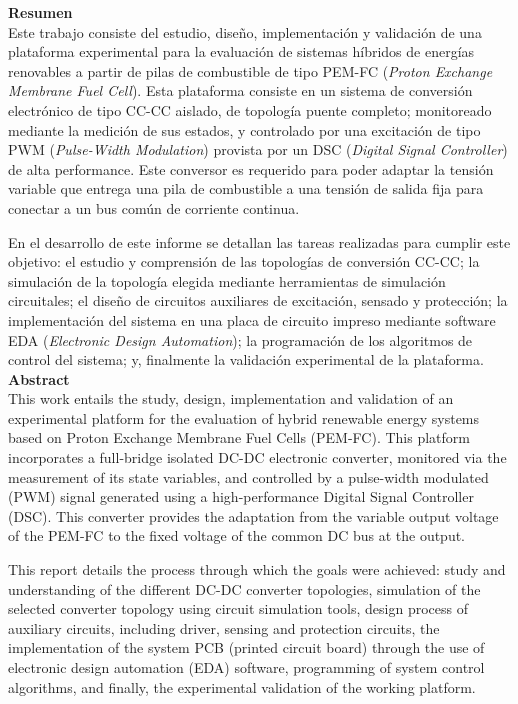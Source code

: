\Huge
\textbf{Resumen}\\

\normalsize
Este trabajo consiste del estudio, diseño, implementación y validación de una plataforma experimental para la evaluación de sistemas híbridos de energías renovables a partir de pilas de combustible de tipo PEM-FC (\textit{Proton Exchange Membrane Fuel Cell}). Esta plataforma consiste en un sistema de conversión electrónico de tipo CC-CC aislado, de topología puente completo; monitoreado mediante la medición de sus estados, y controlado por una excitación de tipo PWM (\textit{Pulse-Width Modulation}) provista por un DSC (\textit{Digital Signal Controller}) de alta performance. Este conversor es requerido para poder adaptar la tensión variable que entrega una pila de combustible a una tensión de salida fija para conectar a un bus común de corriente continua. 

En el desarrollo de este informe se detallan las tareas realizadas para cumplir este objetivo: el estudio y comprensión de las topologías de conversión CC-CC; la simulación de la topología elegida mediante herramientas de simulación circuitales; el diseño de circuitos auxiliares de excitación, sensado y protección; la implementación del sistema en una placa de circuito impreso mediante software EDA (\textit{Electronic Design Automation}); la programación de los algoritmos de control del sistema; y, finalmente la validación experimental de la plataforma.\\

\vspace{1cm}
\Huge
\textbf{Abstract}\\

\normalsize
This work entails the study, design, implementation and validation of an experimental platform for the evaluation of hybrid renewable energy systems based on Proton Exchange Membrane Fuel Cells (PEM-FC). This platform incorporates a full-bridge isolated DC-DC electronic converter, monitored via the measurement of its state variables, and controlled by a pulse-width modulated (PWM) signal generated using a high-performance Digital Signal Controller (DSC). This converter provides the adaptation from the variable output voltage of the PEM-FC to the fixed voltage of the common DC bus at the output.

This report details the process through which the goals were achieved: study and understanding of the different DC-DC converter topologies, simulation of the selected converter topology using circuit simulation tools, design process of auxiliary circuits, including driver, sensing and protection circuits, the implementation of the system PCB (printed circuit board) through the use of electronic design automation (EDA) software, programming of system control algorithms, and finally, the experimental validation of the working platform.\\ 